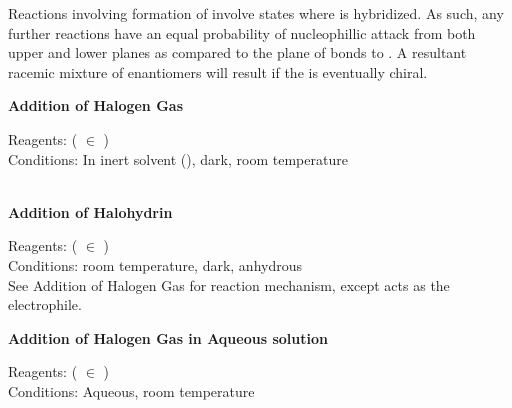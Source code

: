 \documentclass[../main]{subfiles}
\begin{document}
	Reactions involving formation of  involve states where  is  hybridized. As such, any further reactions have an equal probability of nucleophillic attack from both upper and lower planes as compared to the plane of bonds to . A resultant racemic mixture of enantiomers will result if the  is eventually chiral.

	\noindent \textbf{Addition of Halogen Gas}

	Reagents:  ( \(\in\) ) \\
	Conditions: In inert solvent (), dark, room temperature \\

	 \\

	\noindent \textbf{Addition of Halohydrin}

	Reagents:  ( \(\in\) ) \\
	Conditions: room temperature, dark, anhydrous\\

	See Addition of Halogen Gas for reaction mechanism, except  acts as the electrophile.

	\noindent \textbf{Addition of Halogen Gas in Aqueous solution}

	Reagents:  ( \(\in\) ) \\
	Conditions: Aqueous, room temperature \\
	
\end{document}
